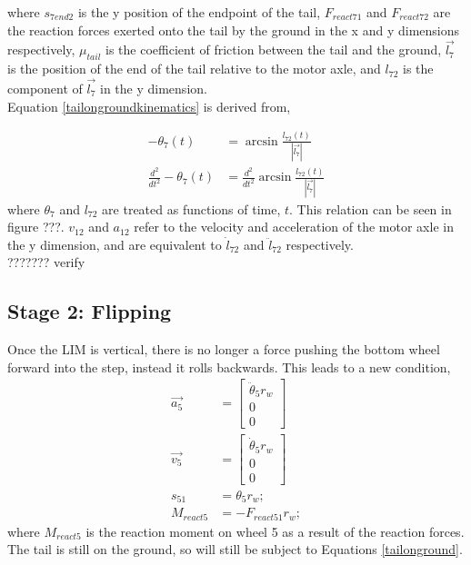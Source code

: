 where $s_{7end2}$ is the y position of the endpoint of the tail, $F_{react71}$ and $F_{react72}$ are the reaction forces exerted onto the tail by the ground in the x and y dimensions respectively, $\mu_{tail}$ is the coefficient of friction between the tail and the ground, $\vec{l_7}$ is the position of the end of the tail relative to the motor axle, and $l_{72}$ is the component of $\vec{l_7}$ in the y dimension. \\
Equation \ref{tailongroundkinematics} is derived from,

\begin{subequations}
	\begin{align}
		-\theta_7(t) &= \arcsin{\frac{l_{72}(t)}{|\vec{l_7}|}}\\
		\frac{d^2}{dt^2}-\theta_7(t) &= \frac{d^2}{dt^2}\arcsin{\frac{l_{72}(t)}{|\vec{l_7}|}}
	\end{align}
\end{subequations}
where $\theta_7$ and $l_{72}$ are treated as functions of time, $t$. This relation can be seen in figure ???. $v_{12}$ and $a_{12}$ refer to the velocity and acceleration of the motor axle in the y dimension, and are equivalent to $\dot{l}_{72}$ and $\ddot{l}_{72}$ respectively.\\ ??????? verify

\subsection*{Stage 2: Flipping}

Once the LIM is vertical, there is no longer a force pushing the bottom wheel forward into the step, instead it rolls backwards. This leads to a new condition,
\begin{subequations}
	\label{wheel1rolling}
	\begin{align}
		\vec{a_5} &= \begin{bmatrix}
			\ddot{\theta}_5 r_w \\
			0\\
			0
		\end{bmatrix}\\
		\vec{v_5} &= \begin{bmatrix}
			\dot{\theta}_5 r_w \\
			0\\
			0
		\end{bmatrix}\\
		s_{51} &= \theta_{5} r_w;\\
		M_{react5} &= - F_{react51} r_w;
	\end{align}
\end{subequations}
where $M_{react5}$ is the reaction moment on wheel 5 as a result of the reaction forces.
The tail is still on the ground, so will still be subject to Equations \ref{tailonground}.

